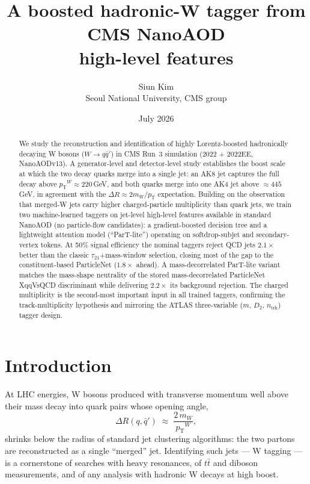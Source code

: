 \documentclass[11pt,a4paper]{article}
\title{\bfseries A boosted hadronic-W tagger from CMS NanoAOD\\
  high-level features}
\author{Siun Kim\\[2pt]
  \small Seoul National University, CMS group}
\date{July 2026}
\newcommand{\pt}{\ensuremath{p_{\mathrm{T}}}}
\begin{document}
\maketitle

\begin{abstract}
\noindent
We study the reconstruction and identification of highly Lorentz-boosted
hadronically decaying W bosons ($W\to q\bar{q}'$) in CMS Run~3 simulation
(2022 + 2022EE, NanoAODv13). A generator-level and detector-level study
establishes the boost scale at which the two decay quarks merge into a single
jet: an AK8 jet captures the full decay above $\pt^{W}\!\approx\!220\,$GeV,
and both quarks merge into one AK4 jet above $\approx 445\,$GeV, in agreement
with the $\Delta R \approx 2m_W/\pt$ expectation. Building on the observation
that merged-W jets carry higher charged-particle multiplicity than quark jets,
we train two machine-learned taggers on jet-level high-level features
available in standard NanoAOD (no particle-flow candidates): a gradient-boosted
decision tree and a lightweight attention model (``ParT-lite'') operating on
softdrop-subjet and secondary-vertex tokens. At 50\% signal efficiency the
nominal taggers reject QCD jets $2.1\times$ better than the classic
$\tau_{21}$+mass-window selection, closing most of the gap to the
constituent-based ParticleNet ($1.8\times$ ahead). A mass-decorrelated
ParT-lite variant matches the mass-shape neutrality of the stored
mass-decorrelated ParticleNet XqqVsQCD discriminant while delivering
$2.2\times$ its background rejection. The charged multiplicity is the
second-most important input in all trained taggers, confirming the
track-multiplicity hypothesis and mirroring the ATLAS three-variable
($m$, $D_2$, $n_{\mathrm{trk}}$) tagger design.
\end{abstract}

\section{Introduction}

At LHC energies, W bosons produced with transverse momentum well above their
mass decay into quark pairs whose opening angle,
\begin{equation}
  \Delta R(q,\bar q') \;\approx\; \frac{2\,m_W}{\pt^{W}},
  \label{eq:dr}
\end{equation}
shrinks below the radius of standard jet clustering algorithms: the two
partons are reconstructed as a single ``merged'' jet. Identifying such jets
--- W tagging --- is a cornerstone of searches with heavy resonances, of
$t\bar{t}$ and diboson measurements, and of any analysis with hadronic W
decays at high boost.
\end{document}
